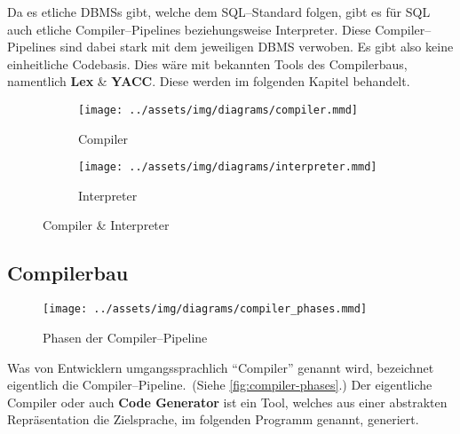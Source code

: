Da es etliche \acp{DBMS} gibt, welche dem \ac{SQL}--Standard folgen, gibt es für \ac{SQL} auch etliche Compiler--Pipelines beziehungsweise Interpreter.
Diese Compiler--Pipelines sind dabei stark mit dem jeweiligen \ac{DBMS} verwoben.
Es gibt also keine einheitliche Codebasis.
Dies wäre mit bekannten Tools des Compilerbaus, namentlich \textbf{Lex} \& \textbf{YACC}.
Diese werden im folgenden Kapitel behandelt.

\begin{figure}[ht]
    \begin{subfigure}[c]{0.5\textwidth}
        \begin{center}
            \texttt{[image: ../assets/img/diagrams/compiler.mmd]}
        \end{center}
        \caption{Compiler}
        \label{subfig:compiler-and-interpreter-compiler}
    \end{subfigure}
    \begin{subfigure}[c]{0.5\textwidth}
        \begin{center}
            \texttt{[image: ../assets/img/diagrams/interpreter.mmd]}
        \end{center}
        \caption{Interpreter}
        \label{subfig:compiler-and-interpreter-interpreter}
    \end{subfigure}
    \caption{Compiler \& Interpreter~\autocite{aho-2006}}
    \label{fig:compiler-and-interpreter}
\end{figure}
\newpage

\subsection{Compilerbau}\label{subsec:compilerbau}
\begin{wrapfigure}{rH}{0.5\textwidth}
    \begin{center}
        \texttt{[image: ../assets/img/diagrams/compiler\_phases.mmd]}
    \end{center}
    \caption{Phasen der Compiler--Pipeline~\autocite{aho-2006}}
    \label{fig:compiler-phases}
\end{wrapfigure}
Was von Entwicklern umgangssprachlich \enquote{Compiler} genannt wird, bezeichnet eigentlich die Compiler--Pipeline.~(Siehe \autoref{fig:compiler-phases}.)
Der eigentliche Compiler oder auch \textbf{Code Generator} ist ein Tool, welches aus einer abstrakten Repräsentation die Zielsprache, im folgenden Programm genannt, generiert.

